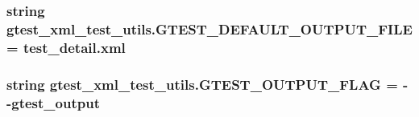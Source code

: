 \subsubsection[{\texorpdfstring{G\+T\+E\+S\+T\+\_\+\+D\+E\+F\+A\+U\+L\+T\+\_\+\+O\+U\+T\+P\+U\+T\+\_\+\+F\+I\+LE}{GTEST_DEFAULT_OUTPUT_FILE}}]{\setlength{\rightskip}{0pt plus 5cm}string gtest\+\_\+xml\+\_\+test\+\_\+utils.\+G\+T\+E\+S\+T\+\_\+\+D\+E\+F\+A\+U\+L\+T\+\_\+\+O\+U\+T\+P\+U\+T\+\_\+\+F\+I\+LE = \textquotesingle{}test\+\_\+detail.\+xml\textquotesingle{}}\hypertarget{namespacegtest__xml__test__utils_aebe969ed368778716d0619214ff7b853}{}\label{namespacegtest__xml__test__utils_aebe969ed368778716d0619214ff7b853}
\subsubsection[{\texorpdfstring{G\+T\+E\+S\+T\+\_\+\+O\+U\+T\+P\+U\+T\+\_\+\+F\+L\+AG}{GTEST_OUTPUT_FLAG}}]{\setlength{\rightskip}{0pt plus 5cm}string gtest\+\_\+xml\+\_\+test\+\_\+utils.\+G\+T\+E\+S\+T\+\_\+\+O\+U\+T\+P\+U\+T\+\_\+\+F\+L\+AG = \textquotesingle{}-\/-\/gtest\+\_\+output\textquotesingle{}}\hypertarget{namespacegtest__xml__test__utils_aa354c3ca453d90f496f4cbc576406fb2}{}\label{namespacegtest__xml__test__utils_aa354c3ca453d90f496f4cbc576406fb2}
